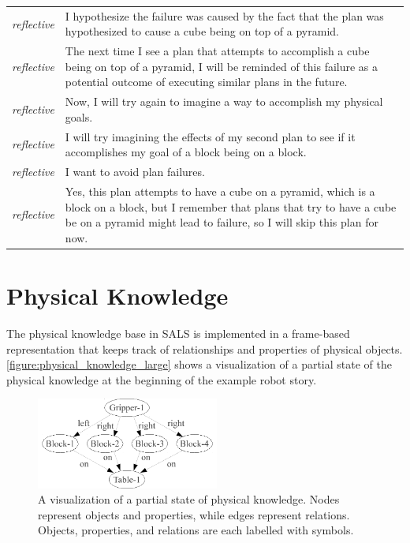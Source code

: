 \begin{tabular}{p{2cm}p{8cm}}
  {\emph{reflective}} & I hypothesize the failure was caused by the
  fact that the plan was hypothesized to cause a cube being on top of
  a pyramid. \\
  
  {\emph{reflective}} & The next time I see a plan that attempts to
  accomplish a cube being on top of a pyramid, I will be reminded of
  this failure as a potential outcome of executing similar plans in
  the future. \\
  
  {\emph{reflective}} & Now, I will try again to imagine a way to
  accomplish my physical goals. \\
  
  {\emph{reflective}} & I will try imagining the effects of my second
  plan to see if it accomplishes my goal of a block being on a
  block. \\
  
  {\emph{reflective}} & I want to avoid plan failures. \\
  
  {\emph{reflective}} & Yes, this plan attempts to have a cube on a
  pyramid, which is a block on a block, but I remember that plans that
  try to have a cube be on a pyramid might lead to failure, so I will
  skip this plan for now. \\
\end{tabular}

















\section{Physical Knowledge}

The physical knowledge base in SALS is implemented in a frame-based
representation that keeps track of relationships and properties of
physical objects.  {\autoref{figure:physical_knowledge_large}} shows a
visualization of a partial state of the physical knowledge at the
beginning of the example robot story.
\begin{figure}
  \center
  \includegraphics[width=6cm]{gfx/physical_knowledge_large}
  \caption[A visualization of a partial state of physical
    knowledge.]{A visualization of a partial state of physical
    knowledge.  Nodes represent objects and properties, while edges
    represent relations.  Objects, properties, and relations are each
    labelled with symbols.}
  \label{figure:physical_knowledge_large}
\end{figure}

